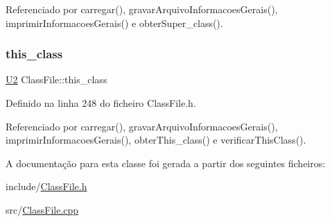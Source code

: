 Referenciado por carregar(), gravar\+Arquivo\+Informacoes\+Gerais(), imprimir\+Informacoes\+Gerais() e obter\+Super\+\_\+class().

\mbox{\label{classClassFile_a205bc5af050f4676fc4c3ff7992c4959}} 
\subsubsection{\texorpdfstring{this\+\_\+class}{this\_class}}
{\footnotesize\ttfamily \hyperlink{BasicTypes_8h_a90240657108b1b457eef9d3f76e0202e}{U2} Class\+File\+::this\+\_\+class\hspace{0.3cm}{\ttfamily [private]}}



Definido na linha 248 do ficheiro Class\+File.\+h.



Referenciado por carregar(), gravar\+Arquivo\+Informacoes\+Gerais(), imprimir\+Informacoes\+Gerais(), obter\+This\+\_\+class() e verificar\+This\+Class().



A documentação para esta classe foi gerada a partir dos seguintes ficheiros\+:\begin{DoxyCompactItemize}
\item 
include/\hyperlink{ClassFile_8h}{Class\+File.\+h}\item 
src/\hyperlink{ClassFile_8cpp}{Class\+File.\+cpp}\end{DoxyCompactItemize}
